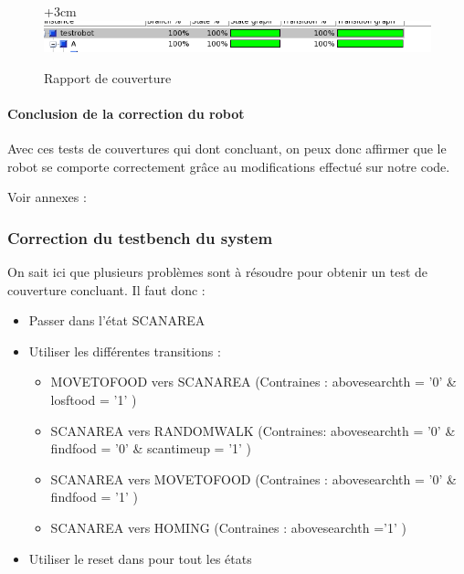 \documentclass{article}
\begin{document}
\begin{figure}[!h]
\advance\leftskip+3cm
\includegraphics[scale=0.7]{PremiereCorrection/resultats.PNG}
\caption{Rapport de couverture}

\end{figure}

\paragraph{Conclusion de la correction du robot}
Avec ces tests de couvertures qui dont concluant, on peux donc affirmer que le robot se comporte correctement grâce au modifications effectué sur notre code.

Voir annexes : 

\subsubsection{Correction du testbench du system}

On sait ici que plusieurs problèmes sont à résoudre pour obtenir un test de couverture concluant. Il faut donc : 
\begin{itemize}
\item Passer dans l'état SCANAREA
\item Utiliser les différentes transitions :
	\begin{itemize}
	\item MOVETOFOOD vers SCANAREA (Contraines : abovesearchth = '0' \& losftood = '1' )
	\item SCANAREA vers RANDOMWALK (Contraines: abovesearchth = '0' \& findfood = '0' \& scantimeup = '1'  )
	\item SCANAREA vers MOVETOFOOD (Contraines : abovesearchth = '0' \& findfood = '1' )
	\item SCANAREA vers HOMING (Contraines : abovesearchth ='1' )
	\end{itemize}
\item Utiliser le reset dans pour tout les états
\end{itemize}
\end{document}
